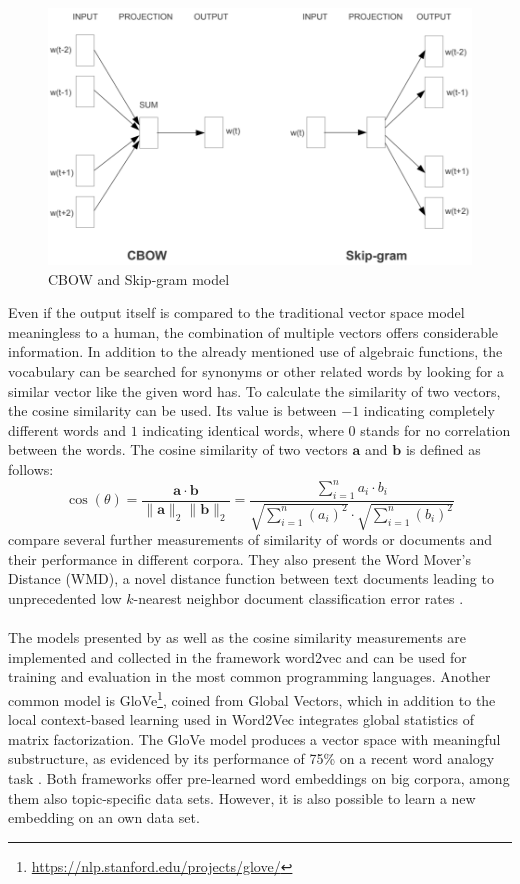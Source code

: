 \documentclass[article,type=msc,colorback,accentcolor=tud7b]{tudthesis}
\begin{document}
    \begin{figure}[H]
      \centering
      \includegraphics[scale=0.75]{images/word_embeddings}
      \caption[CBOW and Skip-gram model]{CBOW and Skip-gram model \autocite{Mikolov2013}}
      \label{fig:word_embeddings}
    \end{figure}
    
    Even if the output itself is compared to the traditional vector space model meaningless to a human, the combination of multiple vectors offers considerable information. In addition to the already mentioned use of algebraic functions, the vocabulary can be searched for synonyms or other related words by looking for a similar vector like the given word has. To calculate the similarity of two vectors, the cosine similarity can be used. Its value is between $-1$ indicating completely different words and $1$ indicating identical words, where $0$ stands for no correlation between the words. The cosine similarity of two vectors $\mathbf{a}$ and $\mathbf{b}$ is defined as follows:
    \[\cos (\theta)=\frac{\mathbf{a} \cdot \mathbf{b}}{\|\mathbf{a}\|_{2}\|\mathbf{b}\|_{2}}=\frac{\sum_{i=1}^{n} a_{i} \cdot b_{i}}{\sqrt{\sum_{i=1}^{n}\left(a_{i}\right)^{2}} \cdot \sqrt{\sum_{i=1}^{n}\left(b_{i}\right)^{2}}}\]
    \citeauthor{Kusner2015} compare several further measurements of similarity of words or documents and their performance in different corpora. They also present the Word Mover’s Distance (WMD), a novel distance function between text documents leading to unprecedented low $k$-nearest neighbor document classification error rates \autocite{Kusner2015}. \\\\
    The models presented by \citeauthor{Mikolov2013} as well as the cosine similarity measurements are implemented and collected in the framework word2vec and can be used for training and evaluation in the most common programming languages. Another common model is GloVe\footnote{\url{https://nlp.stanford.edu/projects/glove/}}, coined from Global Vectors, which in addition to the local context-based learning used in Word2Vec integrates global statistics of matrix factorization. The GloVe model produces a vector space with meaningful substructure, as evidenced by its performance of 75\% on a recent word analogy task \autocite{Pennington2014}. Both frameworks offer pre-learned word embeddings on big corpora, among them also topic-specific data sets. However, it is also possible to learn a new embedding on an own data set.
  \clearpage
  
\end{document}
